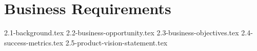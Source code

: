 \section{Business Requirements}

{2.1-background.tex}
{2.2-business-opportunity.tex}
{2.3-business-objectives.tex}
{2.4-success-metrics.tex}
{2.5-product-vision-statement.tex}
